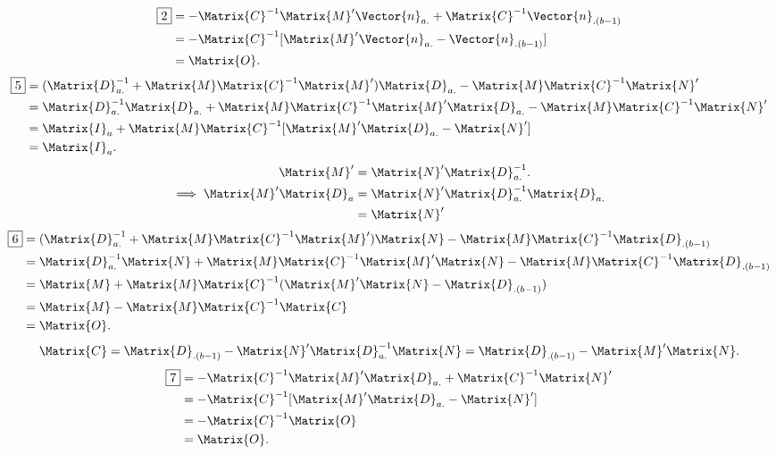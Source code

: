\begin{align*}
    \boxed{2}
     & =-\Matrix{C}^{-1}\Matrix{M}'\Vector{n}_{a.}+\Matrix{C}^{-1}\Vector{n}_{.(b-1)} \\
     & =-\Matrix{C}^{-1}[\Matrix{M}'\Vector{n}_{a.}-\Vector{n}_{.(b-1)}]              \\
     & =\Matrix{O}.
\end{align*}
\begin{align*}
    \boxed{5}
     & =(\Matrix{D}_{a.}^{-1}+\Matrix{M}\Matrix{C}^{-1}\Matrix{M}')\Matrix{D}_{a.}-\Matrix{M}\Matrix{C}^{-1}\Matrix{N}'              \\
     & =\Matrix{D}_{a.}^{-1}\Matrix{D}_{a.}+\Matrix{M}\Matrix{C}^{-1}\Matrix{M}'\Matrix{D}_{a.}-\Matrix{M}\Matrix{C}^{-1}\Matrix{N}' \\
     & =\Matrix{I}_a+\Matrix{M}\Matrix{C}^{-1}[\Matrix{M}'\Matrix{D}_{a.}-\Matrix{N}']                                               \\
     & =\Matrix{I}_a.
\end{align*}
\begin{align*}
    \Matrix{M}'
     & =\Matrix{N}'\Matrix{D}_{a.}^{-1}.               \\
    \implies \Matrix{M}'\Matrix{D}_a
     & =\Matrix{N}'\Matrix{D}_{a.}^{-1}\Matrix{D}_{a.} \\
     & =\Matrix{N}'
\end{align*}
\begin{align*}
    \boxed{6}
     & =(\Matrix{D}_{a.}^{-1}+\Matrix{M}\Matrix{C}^{-1}\Matrix{M}')\Matrix{N}-\Matrix{M}\Matrix{C}^{-1}\Matrix{D}_{.(b-1)}         \\
     & =\Matrix{D}_{a.}^{-1}\Matrix{N}+\Matrix{M}\Matrix{C}^{-1}\Matrix{M}'\Matrix{N}-\Matrix{M}\Matrix{C}^{-1}\Matrix{D}_{.(b-1)} \\
     & =\Matrix{M}+\Matrix{M}\Matrix{C}^{-1}(\Matrix{M}'\Matrix{N}-\Matrix{D}_{.(b-1)})                                            \\
     & =\Matrix{M}-\Matrix{M}\Matrix{C}^{-1}\Matrix{C}                                                                             \\
     & =\Matrix{O}.
\end{align*}
\[ \Matrix{C}=\Matrix{D}_{.(b-1)}-\Matrix{N}'\Matrix{D}_{a.}^{-1}\Matrix{N}=\Matrix{D}_{.(b-1)}-\Matrix{M}'\Matrix{N}. \]
\begin{align*}
    \boxed{7}
     & =-\Matrix{C}^{-1}\Matrix{M}'\Matrix{D}_{a.}+\Matrix{C}^{-1}\Matrix{N}' \\
     & =-\Matrix{C}^{-1}[\Matrix{M}'\Matrix{D}_{a.}-\Matrix{N}']              \\
     & =-\Matrix{C}^{-1}\Matrix{O}                                            \\
     & =\Matrix{O}.
\end{align*}
